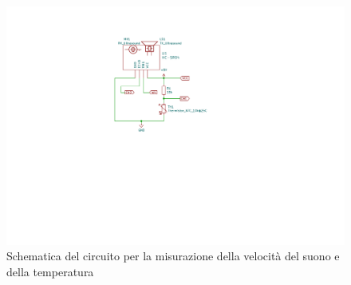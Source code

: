 \documentclass[10pt, a4paper, italian]{article}
\begin{document}
\begin{figure}[htbp]
    \centering
	\includegraphics[scale=1]{schm}
    \caption{Schematica del circuito per la misurazione della velocità del suono e della temperatura
    \label{schm: mesctrl}}
\end{figure}
\end{document}
